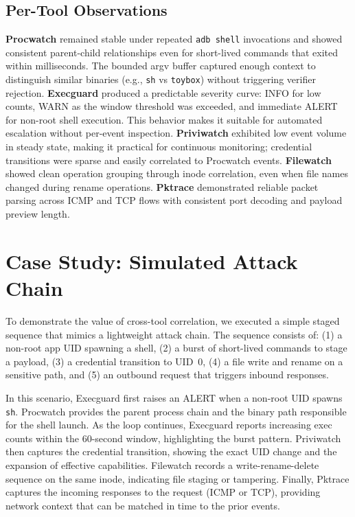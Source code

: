 \documentclass[conference]{IEEEtran}
\begin{document}
\subsection{Per-Tool Observations}
\textbf{Procwatch} remained stable under repeated \texttt{adb shell} invocations and showed consistent parent-child relationships even for short-lived commands that exited within milliseconds. The bounded argv buffer captured enough context to distinguish similar binaries (e.g., \texttt{sh} vs \texttt{toybox}) without triggering verifier rejection. \textbf{Execguard} produced a predictable severity curve: INFO for low counts, WARN as the window threshold was exceeded, and immediate ALERT for non-root shell execution. This behavior makes it suitable for automated escalation without per-event inspection. \textbf{Priviwatch} exhibited low event volume in steady state, making it practical for continuous monitoring; credential transitions were sparse and easily correlated to Procwatch events. \textbf{Filewatch} showed clean operation grouping through inode correlation, even when file names changed during rename operations. \textbf{Pktrace} demonstrated reliable packet parsing across ICMP and TCP flows with consistent port decoding and payload preview length.

\section{Case Study: Simulated Attack Chain}
To demonstrate the value of cross-tool correlation, we executed a simple staged sequence that mimics a lightweight attack chain. The sequence consists of: (1) a non-root app UID spawning a shell, (2) a burst of short-lived commands to stage a payload, (3) a credential transition to UID~0, (4) a file write and rename on a sensitive path, and (5) an outbound request that triggers inbound responses.

In this scenario, Execguard first raises an ALERT when a non-root UID spawns \texttt{sh}. Procwatch provides the parent process chain and the binary path responsible for the shell launch. As the loop continues, Execguard reports increasing exec counts within the 60-second window, highlighting the burst pattern. Priviwatch then captures the credential transition, showing the exact UID change and the expansion of effective capabilities. Filewatch records a write-rename-delete sequence on the same inode, indicating file staging or tampering. Finally, Pktrace captures the incoming responses to the request (ICMP or TCP), providing network context that can be matched in time to the prior events.
\end{document}
